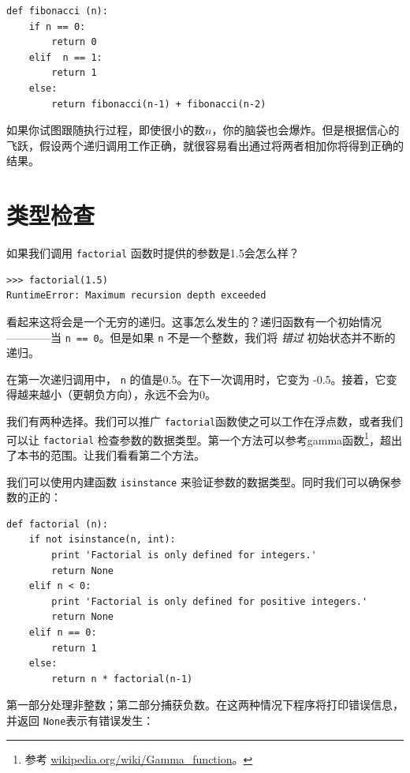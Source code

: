 \beforeverb
\begin{verbatim}
def fibonacci (n):
    if n == 0:
        return 0
    elif  n == 1:
        return 1
    else:
        return fibonacci(n-1) + fibonacci(n-2)
\end{verbatim}
\afterverb
%
如果你试图跟随执行过程，即使很小的数$n$，你的脑袋也会爆炸。但是根据信心的飞跃，假设两个递归调用工作正确，就很容易看出通过将两者相加你将得到正确的结果。



\section{类型检查}
\label{监护人}


如果我们调用 {\tt factorial} 函数时提供的参数是1.5会怎么样？


\beforeverb
\begin{verbatim}
>>> factorial(1.5)
RuntimeError: Maximum recursion depth exceeded
\end{verbatim}
\afterverb
%
看起来这将会是一个无穷的递归。这事怎么发生的？递归函数有一个初始情况————当 {\tt n == 0}。但是如果 {\tt n} 不是一个整数，我们将 {\em 错过} 初始状态并不断的递归。


在第一次递归调用中， {\tt n} 的值是0.5。在下一次调用时，它变为 -0.5。接着，它变得越来越小（更朝负方向），永远不会为0。

我们有两种选择。我们可以推广 {\tt factorial}函数使之可以工作在浮点数，或者我们可以让 {\tt factorial} 检查参数的数据类型。第一个方法可以参考gamma函数\footnote{参考 \url{wikipedia.org/wiki/Gamma_function}。}，超出了本书的范围。让我们看看第二个方法。


我们可以使用内建函数 {\tt isinstance} 来验证参数的数据类型。同时我们可以确保参数的正的：


\beforeverb
\begin{verbatim}
def factorial (n):
    if not isinstance(n, int):
        print 'Factorial is only defined for integers.'
        return None
    elif n < 0:
        print 'Factorial is only defined for positive integers.'
        return None
    elif n == 0:
        return 1
    else:
        return n * factorial(n-1)
\end{verbatim}
\afterverb
%
第一部分处理非整数；第二部分捕获负数。在这两种情况下程序将打印错误信息，并返回 {\tt None}表示有错误发生：

